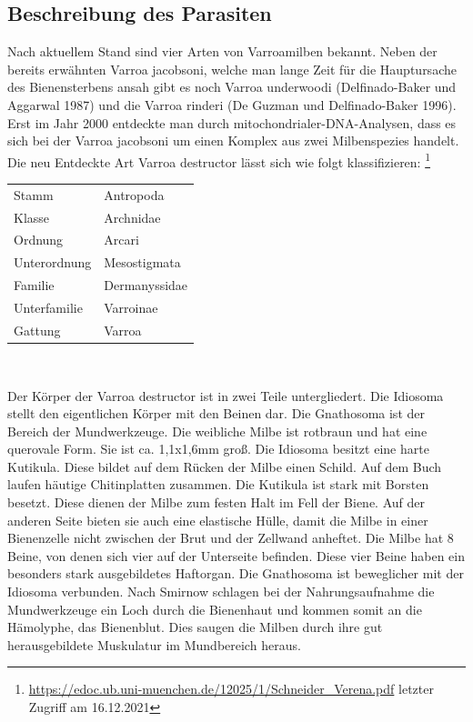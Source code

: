\documentclass[11pt,a4paper]{article}
\begin{document}
\subsection{Beschreibung des Parasiten}
Nach aktuellem Stand sind vier Arten von Varroamilben bekannt. Neben der bereits erwähnten Varroa jacobsoni, welche man lange Zeit für die Hauptursache des Bienensterbens ansah gibt es noch Varroa underwoodi (Delfinado-Baker und Aggarwal 1987) und die Varroa rinderi (De Guzman und Delfinado-Baker 1996). Erst im Jahr 2000 entdeckte man durch mitochondrialer-DNA-Analysen, dass es sich bei der Varroa jacobsoni um einen Komplex aus zwei Milbenspezies handelt. Die neu Entdeckte Art Varroa destructor lässt sich wie folgt klassifizieren: \footnote{\url{https://edoc.ub.uni-muenchen.de/12025/1/Schneider_Verena.pdf} letzter Zugriff am 16.12.2021}\\
\begin{center}
\begin{tabular}{l|l}
     Stamm & Antropoda \\
     Klasse & Archnidae  \\
     Ordnung & Arcari \\
     Unterordnung & Mesostigmata \\
     Familie & Dermanyssidae \\
     Unterfamilie & Varroinae \\
     Gattung & Varroa \\
\end{tabular}\\
\end{center}
Der Körper der Varroa destructor ist in zwei Teile untergliedert. Die Idiosoma stellt den eigentlichen Körper mit den Beinen dar. Die Gnathosoma ist der Bereich der Mundwerkzeuge. 
Die weibliche Milbe ist rotbraun und hat eine querovale Form. Sie ist ca. 1,1x1,6mm groß. Die Idiosoma besitzt eine harte Kutikula. Diese bildet auf dem Rücken der Milbe einen Schild. Auf dem Buch laufen häutige Chitinplatten zusammen. Die Kutikula ist stark mit Borsten besetzt. Diese dienen der Milbe zum festen Halt im Fell der Biene. Auf der anderen Seite bieten sie auch eine elastische Hülle, damit die Milbe in einer Bienenzelle nicht zwischen der Brut und der Zellwand anheftet. Die Milbe hat 8 Beine, von denen sich vier auf der Unterseite befinden. Diese vier Beine haben ein besonders stark ausgebildetes Haftorgan. 
Die Gnathosoma ist beweglicher mit der Idiosoma verbunden. Nach Smirnow schlagen bei der Nahrungsaufnahme die Mundwerkzeuge ein Loch durch die Bienenhaut und kommen somit an die Hämolyphe, das Bienenblut. Dies saugen die Milben durch ihre gut herausgebildete Muskulatur im Mundbereich heraus. 
\end{document}
